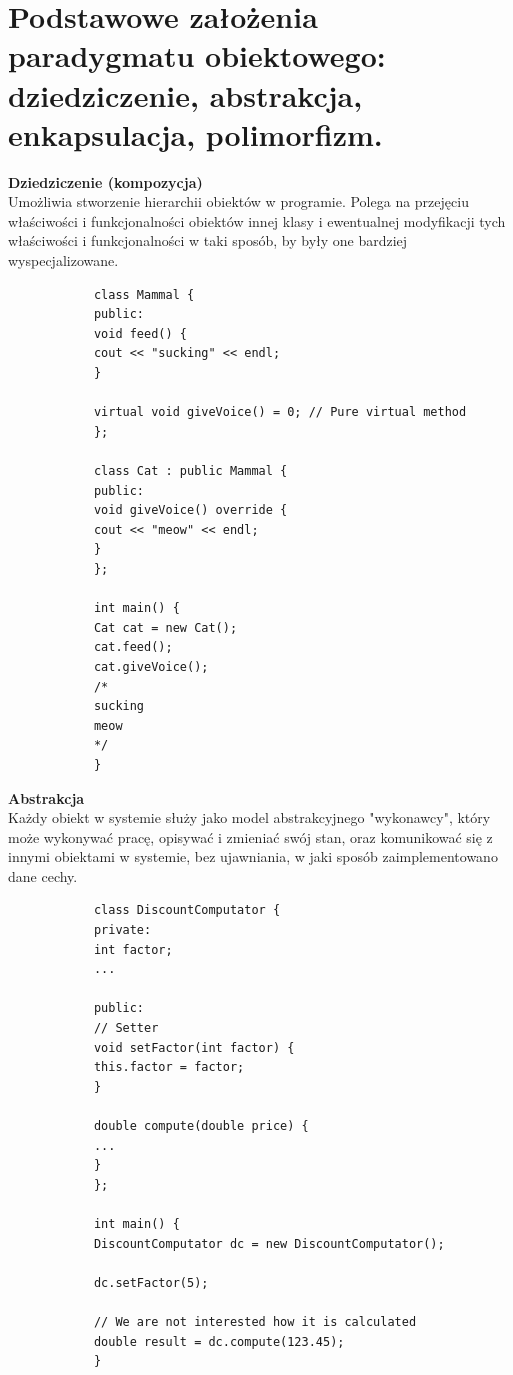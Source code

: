 \documentclass[12pt]{article}
\begin{document}
    \section{Podstawowe założenia paradygmatu obiektowego: dziedziczenie, abstrakcja, enkapsulacja, polimorfizm.}
    \begin{definition}
        \textbf{Dziedziczenie (kompozycja)} \\
        Umożliwia stworzenie hierarchii obiektów w programie. Polega na przejęciu właściwości i funkcjonalności obiektów innej klasy
        i ewentualnej modyfikacji tych właściwości i funkcjonalności w taki sposób, by były one bardziej wyspecjalizowane.
        \begin{verbatim}
            class Mammal {
            public:
            void feed() {
            cout << "sucking" << endl;
            }

            virtual void giveVoice() = 0; // Pure virtual method
            };

            class Cat : public Mammal {
            public:
            void giveVoice() override {
            cout << "meow" << endl;
            }
            };

            int main() {
            Cat cat = new Cat();
            cat.feed();
            cat.giveVoice();
            /*
            sucking
            meow
            */
            }
        \end{verbatim}
    \end{definition}

    \begin{definition}
        \textbf{Abstrakcja} \\
        Każdy obiekt w systemie służy jako model abstrakcyjnego "wykonawcy", który może wykonywać pracę, opisywać i zmieniać swój stan, oraz komunikować się
        z innymi obiektami w systemie, bez ujawniania, w jaki sposób zaimplementowano dane cechy.
        \begin{verbatim}
            class DiscountComputator {
            private:
            int factor;
            ...

            public:
            // Setter
            void setFactor(int factor) {
            this.factor = factor;
            }

            double compute(double price) {
            ...
            }
            };

            int main() {
            DiscountComputator dc = new DiscountComputator();

            dc.setFactor(5);

            // We are not interested how it is calculated
            double result = dc.compute(123.45);
            }
        \end{verbatim}
    \end{definition}
\end{document}

